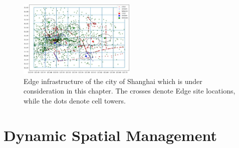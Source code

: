 \begin{figure}
\centering
\includegraphics[width=0.5\textwidth]{figures/mechanisms/shanghai_infrastructure.JPG}
\caption{Edge infrastructure of the city of Shanghai which is under consideration in this chapter. The crosses denote Edge site locations, while the dots denote cell towers. }
\label{fig:shanghai_infra}
\end{figure}

\section{Dynamic Spatial Management}

